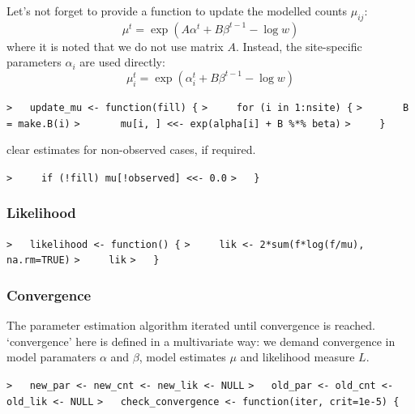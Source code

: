 \documentclass[a4paper]{article}
\begin{document}
Let's not forget to provide a function to update the modelled counts $\mu_{ij}$:
$$ \mu^t = \exp(A\alpha^t + B\beta^{t-1} - \log w) $$
where it is noted that we do not use matrix $A$. Instead, the site-specific
parameters $\alpha_i$ are used directly:
$$ \mu_i^t = \exp(\alpha_i^t + B\beta^{t-1} - \log w) $$\par
\verb~>   update_mu <- function(fill) {~\newline
\verb~>     for (i in 1:nsite) {~\newline
\verb~>       B = make.B(i)~\newline
\verb~>       mu[i, ] <<- exp(alpha[i] + B %*% beta)~\newline
\verb~>     }~\par
clear estimates for non-observed cases, if required.\par
\verb~>     if (!fill) mu[!observed] <<- 0.0~\newline
\verb~>   }~\par



\subsubsection{Likelihood}\par

\verb~>   likelihood <- function() {~\newline
\verb~>     lik <- 2*sum(f*log(f/mu), na.rm=TRUE)~\newline
\verb~>     lik~\newline
\verb~>   }~\par



\subsubsection{Convergence}\par

The parameter estimation algorithm iterated until convergence is reached.
`convergence' here is defined in a multivariate way: we demand convergence in
model paramaters $\alpha$ and $\beta$, model estimates $\mu$ and likelihood measure $L$.\par
\verb~>   new_par <- new_cnt <- new_lik <- NULL~\newline
\verb~>   old_par <- old_cnt <- old_lik <- NULL~\newline
\verb~>   check_convergence <- function(iter, crit=1e-5) {~\par
\end{document}
